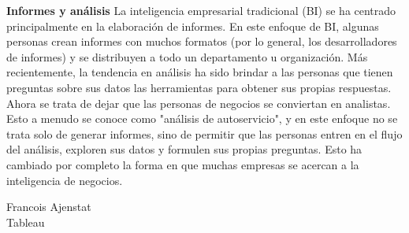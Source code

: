 \textbf{Informes y análisis}
La inteligencia empresarial tradicional (BI) se ha centrado principalmente en la elaboración de informes. En este enfoque de BI, algunas personas crean informes con muchos formatos (por lo general, los desarrolladores de informes) y se distribuyen a todo un departamento u organización. Más recientemente, la tendencia en análisis ha sido brindar a las personas que tienen preguntas sobre sus datos las herramientas para obtener sus propias respuestas. Ahora se trata de dejar que las personas de negocios se conviertan en analistas.\\ Esto a menudo se conoce como "análisis de autoservicio", y en este enfoque no se trata solo de generar informes, sino de permitir que las personas entren en el flujo del análisis, exploren sus datos y formulen sus propias preguntas. Esto ha cambiado por completo la forma en que muchas empresas se acercan a la inteligencia de negocios.
\begin{flushleft}
Francois Ajenstat \\  
Tableau
\end{flushleft}